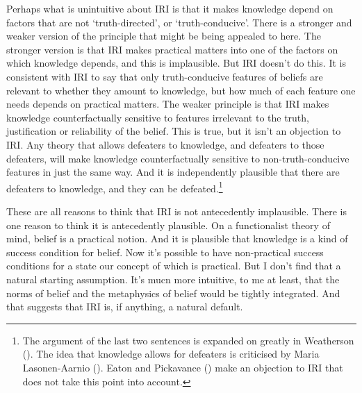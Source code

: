 \documentclass[
  11pt,
  letterpaper,
  DIV=11,
  numbers=noendperiod,
  twoside]{scrartcl}
\begin{document}
Perhaps what is unintuitive about IRI is that it makes knowledge depend
on factors that are not `truth-directed', or `truth-conducive'. There is
a stronger and weaker version of the principle that might be being
appealed to here. The stronger version is that IRI makes practical
matters into one of the factors on which knowledge depends, and this is
implausible. But IRI doesn't do this. It is consistent with IRI to say
that only truth-conducive features of beliefs are relevant to whether
they amount to knowledge, but how much of each feature one needs depends
on practical matters. The weaker principle is that IRI makes knowledge
counterfactually sensitive to features irrelevant to the truth,
justification or reliability of the belief. This is true, but it isn't
an objection to IRI. Any theory that allows defeaters to knowledge, and
defeaters to those defeaters, will make knowledge counterfactually
sensitive to non-truth-conducive features in just the same way. And it
is independently plausible that there are defeaters to knowledge, and
they can be defeated.\footnote{The argument of the last two sentences is
  expanded on greatly in Weatherson
  (). The idea that
  knowledge allows for defeaters is criticised by Maria Lasonen-Aarnio
  (). Eaton and Pickavance
  () make an objection to IRI
  that does not take this point into account.}

These are all reasons to think that IRI is not antecedently implausible.
There is one reason to think it is antecedently plausible. On a
functionalist theory of mind, belief is a practical notion. And it is
plausible that knowledge is a kind of success condition for belief. Now
it's possible to have non-practical success conditions for a state our
concept of which is practical. But I don't find that a natural starting
assumption. It's mucn more intuitive, to me at least, that the norms of
belief and the metaphysics of belief would be tightly integrated. And
that suggests that IRI is, if anything, a natural default.
\end{document}
